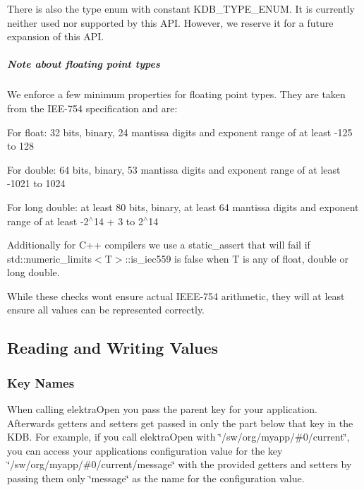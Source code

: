 There is also the type {\ttfamily enum} with constant {\ttfamily K\+D\+B\+\_\+\+T\+Y\+P\+E\+\_\+\+E\+N\+UM}. It is currently neither used nor supported by this A\+PI. However, we reserve it for a future expansion of this A\+PI.

\subparagraph*{Note about floating point types}

We enforce a few minimum properties for floating point types. They are taken from the I\+E\+E-\/754 specification and are\+:


\begin{DoxyItemize}
\item For {\ttfamily float}\+: 32 bits, binary, 24 mantissa digits and exponent range of at least -\/125 to 128
\item For {\ttfamily double}\+: 64 bits, binary, 53 mantissa digits and exponent range of at least -\/1021 to 1024
\item For {\ttfamily long double}\+: at least 80 bits, binary, at least 64 mantissa digits and exponent range of at least -\/2$^\wedge$14 + 3 to 2$^\wedge$14
\end{DoxyItemize}

Additionally for C++ compilers we use a {\ttfamily static\+\_\+assert} that will fail if {\ttfamily std\+::numeric\+\_\+limits$<$T$>$\+::is\+\_\+iec559} is {\ttfamily false} when {\ttfamily T} is any of {\ttfamily float}, {\ttfamily double} or {\ttfamily long double}.

While these checks won\textquotesingle{}t ensure actual I\+E\+E\+E-\/754 arithmetic, they will at least ensure all values can be represented correctly.

\label{_reading-and-writing-values}%


\subsection*{Reading and Writing Values}

\subsubsection*{Key Names}

When calling {\ttfamily elektra\+Open} you pass the parent key for your application. Afterwards getters and setters get passed in only the part below that key in the K\+DB. For example, if you call {\ttfamily elektra\+Open} with {\ttfamily \char`\"{}/sw/org/myapp/\#0/current\char`\"{}}, you can access your applications configuration value for the key {\ttfamily \char`\"{}/sw/org/myapp/\#0/current/message\char`\"{}} with the provided getters and setters by passing them only {\ttfamily \char`\"{}message\char`\"{}} as the name for the configuration value.

